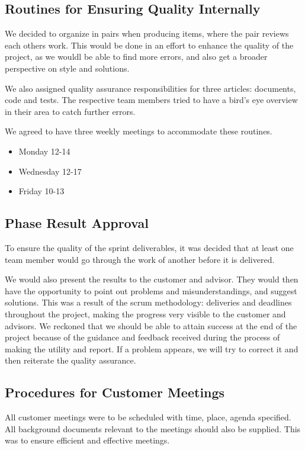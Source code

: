 \subsection{Routines for Ensuring Quality Internally}
We decided to organize in pairs when producing items, where the pair reviews each others work. This would be done in an effort to enhance the quality of the project, as we wouldl be able to find more errors, and 
also get a broader perspective on style and solutions.

We also assigned quality assurance responsibilities for three articles: documents, code and tests. The respective team members tried to have a bird's eye overview in their area to catch further errors.

We agreed to have three weekly meetings to accommodate these routines.
\begin{itemize}
	\item Monday 12-14
	\item Wednesday 12-17
	\item Friday 10-13
\end{itemize}

\subsection{Phase Result Approval}
To ensure the quality of the sprint deliverables, it was decided that at least one team member would go through the work of another before it is delivered.

We would also present the results to the customer and advisor. They would then have the opportunity to point out problems and misunderstandings, and suggest solutions. This was a result of the \Gls{scrum} methodology: deliveries and deadlines throughout the project, making the progress very visible to the customer and advisors. We reckoned that we should be able to attain success at the end of the project because of the guidance and feedback received during the process of making the utility and report. If a problem appears, we will try to correct it and then reiterate the quality assurance.

\subsection{Procedures for Customer Meetings}
All customer meetings were to be scheduled with time, place, agenda specified. All background documents relevant to the meetings should also be supplied. This was to ensure efficient and effective meetings.

